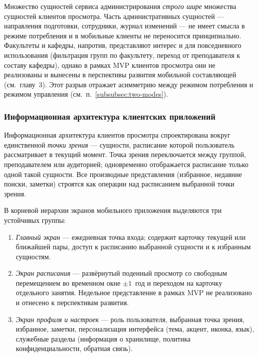 Множество сущностей сервиса администрирования \emph{строго шире} множества сущностей клиентов просмотра. Часть административных сущностей --- направления подготовки, сотрудники, журнал изменений --- не имеет смысла в режиме потребления и в мобильные клиенты не переносится принципиально. Факультеты и кафедры, напротив, представляют интерес и для повседневного использования (фильтрация групп по факультету, переход от преподавателя к составу кафедры), однако в рамках MVP клиентов просмотра они не реализованы и вынесены в перспективы развития мобильной составляющей (см.~главу~3). Этот разрыв отражает асимметрию между режимом потребления и режимом управления (см.~п.~\ref{subsubsec:two-modes}).

\subsubsection{Информационная архитектура клиентских приложений}
\label{subsubsec:information-architecture}

Информационная архитектура клиентов просмотра спроектирована вокруг единственной \emph{точки зрения} --- сущности, расписание которой пользователь рассматривает в текущий момент. Точка зрения переключается между группой, преподавателем или аудиторией; одновременно отображается расписание только одной такой сущности. Все производные представления (избранное, недавние поиски, заметки) строятся как операции над расписанием выбранной точки зрения.

В корневой иерархии экранов мобильного приложения выделяются три устойчивых группы:

\begin{enumerate}
  \item \emph{Главный экран} --- ежедневная точка входа; содержит карточку текущей или ближайшей пары, доступ к расписанию выбранной сущности и к избранным сущностям.
  \item \emph{Экран расписания} --- развёрнутый поденный просмотр со свободным перемещением во временном окне $\pm 1$~год и переходом на карточку отдельного занятия. Недельное представление в рамках MVP не реализовано и отнесено к перспективам развития.
  \item \emph{Экран профиля и настроек} --- роль пользователя, выбранная точка зрения, избранное, заметки, персонализация интерфейса (тема, акцент, иконка, язык), служебные разделы (информация о хранилище, политика конфиденциальности, обратная связь).
\end{enumerate}

